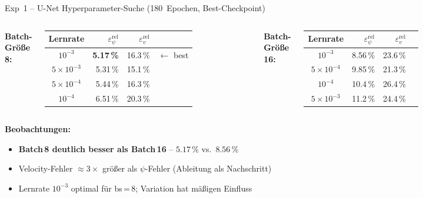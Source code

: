 \documentclass[aspectratio=169]{beamer}
\begin{document}
\begin{frame}{Exp~1 -- U-Net Hyperparameter-Suche (180~Epochen, Best-Checkpoint)}
  \begin{columns}[T]
      \textbf{Batch-Größe 8:}
      \vspace{4pt}
      \renewcommand{\arraystretch}{1.35}
      \begin{tabular}{crrl}
        \toprule
        Lernrate & $\varepsilon_\psi^{\text{rel}}$ & $\varepsilon_v^{\text{rel}}$ & \\
        \midrule
        $10^{-3}$            & \textcolor{bestgreen}{\textbf{5.17\,\%}} & 16.3\,\% & $\leftarrow$ best \\
        $5\!\times\!10^{-3}$ & 5.31\,\% & 15.1\,\% & \\
        $5\!\times\!10^{-4}$ & 5.44\,\% & 16.3\,\% & \\
        $10^{-4}$            & 6.51\,\% & 20.3\,\% & \\
        \bottomrule
      \end{tabular}

      \textbf{Batch-Größe 16:}
      \vspace{4pt}
      \renewcommand{\arraystretch}{1.35}
      \begin{tabular}{crrl}
        \toprule
        Lernrate & $\varepsilon_\psi^{\text{rel}}$ & $\varepsilon_v^{\text{rel}}$ & \\
        \midrule
        $10^{-3}$            & 8.56\,\% & 23.6\,\% & \\
        $5\!\times\!10^{-4}$ & 9.85\,\% & 21.3\,\% & \\
        $10^{-4}$            & 10.4\,\%  & 26.4\,\% & \\
        $5\!\times\!10^{-3}$ & \textcolor{warnred}{11.2\,\%} & 24.4\,\% & \\
        \bottomrule
      \end{tabular}
  \end{columns}

  \vspace{10pt}
  \textbf{Beobachtungen:}
  \begin{itemize}
    \item \textbf{Batch\,8 deutlich besser als Batch\,16} -- $5.17\,\%$ vs.\ $8.56\,\%$
    \item Velocity-Fehler $\approx 3\times$ größer als $\psi$-Fehler (Ableitung als Nachschritt)
    \item Lernrate $10^{-3}$ optimal für bs\,=\,8; Variation hat mäßigen Einfluss
  \end{itemize}
\end{frame}
\end{document}

